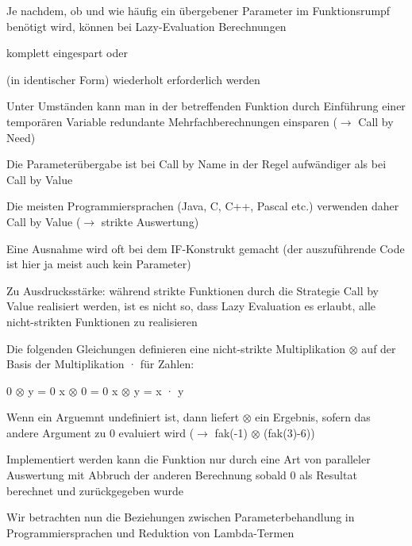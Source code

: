\documentclass[10pt]{article}
\begin{document}
\begin{itemize*}
\begin{itemize*}
\begin{itemize*}
  \end{itemize*}
  \item Je nachdem, ob und wie häufig ein übergebener Parameter im Funktionsrumpf benötigt wird, können bei Lazy-Evaluation Berechnungen
  \begin{itemize*}
    \item komplett eingespart oder
    \item (in identischer Form) wiederholt erforderlich werden
    \item Unter Umständen kann man in der betreffenden Funktion durch Einführung einer temporären Variable redundante Mehrfachberechnungen einsparen ($\rightarrow$ Call by Need)
  \end{itemize*}
  \item Die Parameterübergabe ist bei Call by Name in der Regel aufwändiger als bei Call by Value
  \begin{itemize*}
    \item Die meisten Programmiersprachen (Java, C, C++, Pascal etc.) verwenden daher Call by Value ($\rightarrow$ strikte Auswertung)
    \item Eine Ausnahme wird oft bei dem IF-Konstrukt gemacht (der auszuführende Code ist hier ja meist auch kein Parameter)
  \end{itemize*}
  \item Zu Ausdrucksstärke: während strikte Funktionen durch die Strategie Call by Value realisiert werden, ist es nicht so, dass Lazy Evaluation es erlaubt, alle nicht-strikten Funktionen zu realisieren
  \begin{itemize*}
    \item Die folgenden Gleichungen definieren eine nicht-strikte Multiplikation $\otimes$ auf der Basis der Multiplikation · für Zahlen:\newline \begin{center}
      0 $\otimes$ y = 0 \newline
      x $\otimes$ 0 = 0 \newline
      x $\otimes$ y = x · y \newline
    \end{center}
    \item Wenn ein Arguemnt undefiniert ist, dann liefert $\otimes$ ein Ergebnis, sofern das andere Argument zu 0 evaluiert wird ($\rightarrow$ fak(-1) $\otimes$ (fak(3)-6))
    \item Implementiert werden kann die Funktion nur durch eine Art von paralleler Auswertung mit Abbruch der anderen Berechnung sobald 0 als Resultat berechnet und zurückgegeben wurde
  \end{itemize*}
  \item Wir betrachten nun die Beziehungen zwischen Parameterbehandlung in Programmiersprachen und Reduktion von Lambda-Termen
\end{itemize*}

\end{itemize*}
\end{document}
